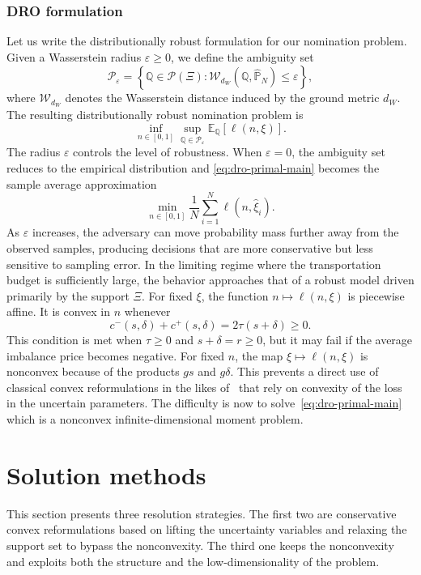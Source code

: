 \documentclass[11pt]{article}
\newcommand{\E}{\mathbb{E}}
\newcommand{\Q}{\mathbb{Q}}
\newcommand{\cP}{\mathcal{P}}
\newcommand{\XiSet}{\Xi}
\newcommand{\eps}{\varepsilon}
\newcommand{\hxi}{\widehat\xi}
\newcommand{\hP}{\widehat{\mathbb P}_N}
\theoremstyle{plain}
\theoremstyle{definition}
\begin{document}
\subsubsection{DRO formulation}
Let us write the distributionally robust formulation for our nomination problem.
Given a Wasserstein radius $\eps\ge0$, we define the ambiguity set 
    \begin{equation} 
        \label{eq:wasserstein-ambiguity} 
        \cP_\eps = \left\{ \Q\in\cP(\XiSet): \mathcal{W}_{d_W}(\Q,\hP)\le \eps \right\}, 
    \end{equation} 
    where $\mathcal{W}_{d_W}$ denotes the Wasserstein distance induced by the ground metric $d_W$. 
    The resulting distributionally robust nomination problem is 
    \begin{equation} \label{eq:dro-primal-main} \inf_{n\in[0,1]} \sup_{\Q\in\cP_\eps} \E_\Q[\ell(n,\xi)] . \end{equation} 
    The radius $\eps$ controls the level of robustness. When $\eps=0$, the ambiguity set reduces to the empirical distribution and \eqref{eq:dro-primal-main} becomes the sample average approximation \begin{equation} \label{eq:saa-pb} \min_{n\in[0,1]} \frac1N\sum_{i=1}^N \ell(n,\hxi_i). \end{equation}
    As $\eps$ increases, the adversary can move probability mass further away from the observed samples, producing decisions that are more conservative but less sensitive to sampling error. 
    In the limiting regime where the transportation budget is sufficiently large, the behavior approaches that of a robust model driven primarily by the support $\XiSet$. 
    For fixed $\xi$, the function $n\mapsto\ell(n,\xi)$ is piecewise affine. 
    It is convex in $n$ whenever \begin{equation} \label{eq:convexity-condition} c^-(s,\delta)+c^+(s,\delta) = 2\tau(s+\delta) \ge0. \end{equation}
    This condition is met when $\tau\ge0$ and $s+\delta=r\ge0$, but it may fail if the average imbalance price becomes negative. 
    For fixed $n$, the map $\xi\mapsto\ell(n,\xi)$ is nonconvex because of the products $gs$ and $g\delta$. 
    This prevents a direct use of classical convex reformulations in the likes of~\cite{EsfahaniKuhn2018} that rely on convexity of the loss in the uncertain parameters. 
    The difficulty is now to solve~\eqref{eq:dro-primal-main} which is a nonconvex infinite-dimensional moment problem.
    
\section{Solution methods} 
\label{sec:solution-methods} 
This section presents three resolution strategies.
The first two are conservative convex reformulations based on lifting the uncertainty variables and relaxing the support set to bypass the nonconvexity. 
The third one keeps the nonconvexity and exploits both the structure and the low-dimensionality of the problem. 
\end{document}

